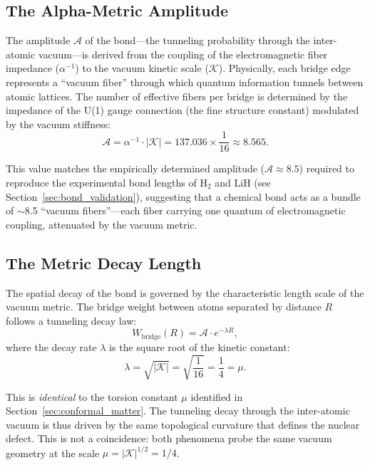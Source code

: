 \documentclass[aps,prd,twocolumn,superscriptaddress,groupedaddress,showpacs]{revtex4-2}
\newcommand{\alphainv}{\ensuremath{\alpha^{-1}}}
\begin{document}
\subsection{The Alpha-Metric Amplitude}

The amplitude $\mathcal{A}$ of the bond---the tunneling probability through the inter-atomic vacuum---is derived from the coupling of the electromagnetic fiber impedance ($\alphainv$) to the vacuum kinetic scale ($\mathcal{K}$). Physically, each bridge edge represents a ``vacuum fiber'' through which quantum information tunnels between atomic lattices. The number of effective fibers per bridge is determined by the impedance of the U(1) gauge connection (the fine structure constant) modulated by the vacuum stiffness:
\begin{equation}
\mathcal{A} = \alphainv \cdot |\mathcal{K}| = 137.036 \times \frac{1}{16} \approx 8.565.
\label{eq:bridge_amplitude}
\end{equation}

This value matches the empirically determined amplitude ($\mathcal{A} \approx 8.5$) required to reproduce the experimental bond lengths of H$_2$ and LiH (see Section~\ref{sec:bond_validation}), suggesting that a chemical bond acts as a bundle of $\sim$8.5 ``vacuum fibers''---each fiber carrying one quantum of electromagnetic coupling, attenuated by the vacuum metric.

\subsection{The Metric Decay Length}

The spatial decay of the bond is governed by the characteristic length scale of the vacuum metric. The bridge weight between atoms separated by distance $R$ follows a tunneling decay law:
\begin{equation}
W_{\text{bridge}}(R) = \mathcal{A} \cdot e^{-\lambda R},
\label{eq:bridge_decay}
\end{equation}
where the decay rate $\lambda$ is the square root of the kinetic constant:
\begin{equation}
\lambda = \sqrt{|\mathcal{K}|} = \sqrt{\frac{1}{16}} = \frac{1}{4} = \mu.
\label{eq:decay_rate}
\end{equation}

This is \emph{identical} to the torsion constant $\mu$ identified in Section~\ref{sec:conformal_matter}. The tunneling decay through the inter-atomic vacuum is thus driven by the same topological curvature that defines the nuclear defect. This is not a coincidence: both phenomena probe the same vacuum geometry at the scale $\mu = |\mathcal{K}|^{1/2} = 1/4$.
\end{document}
